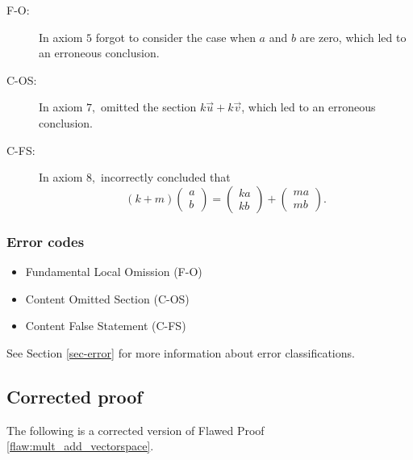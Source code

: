  \begin{description}
 	\item[F-O:] In axiom $5$ forgot to consider the case when $a$ and $b$ are zero, which led to an erroneous conclusion.
 	\item[C-OS:] In axiom $7,$ omitted the section $k \vec{u} + k \vec{v}$, which led to an erroneous conclusion.
 	\item[C-FS:] In axiom $8,$ incorrectly concluded that
$$\left(k+m\right) \begin{pmatrix}
a \\
b
\end{pmatrix} = \begin{pmatrix}
ka \\
kb
\end{pmatrix} + \begin{pmatrix}
ma \\
mb
\end{pmatrix}.$$
 \end{description}


\subsubsection{Error codes}
\begin{itemize}
	\item 	Fundamental Local Omission (F-O)
	\item   Content Omitted Section (C-OS)
	\item   Content False Statement (C-FS)
\end{itemize}
See Section \ref{sec-error} for more information about error classifications.

\clearpage
\subsection{Corrected proof}

The following is a corrected version of Flawed Proof \ref{flaw:mult_add_vectorspace}. %

